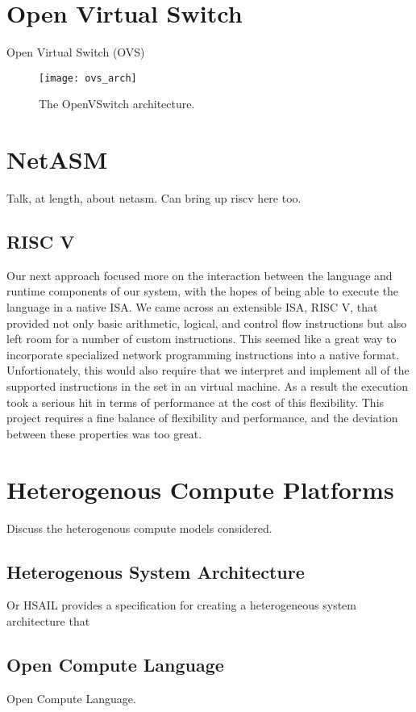 \section{Open Virtual Switch}
\label{related:ovs}
Open Virtual Switch (OVS)
\begin{figure}[h]
\centering
\texttt{[image: ovs\_arch]}
\caption{The OpenVSwitch architecture.}
\label{related:ovs_arch}
\end{figure}

\section{NetASM}
\label{related:netasm}
Talk, at length, about netasm. Can bring up riscv here too.

\subsection{RISC V}
Our next approach focused more on the interaction between the language and
runtime components of our system, with the hopes of being able to execute
the language in a native ISA. We came across an extensible ISA, RISC V, that
provided not only basic arithmetic, logical, and control flow instructions but
also left room for a number of custom instructions. This seemed like a great
way to incorporate specialized network programming instructions into a native
format. Unfortionately, this would also require that we interpret and implement
all of the supported instructions in the set in an virtual machine. As a result
the execution took a serious hit in terms of performance at the cost of this
flexibility. This project requires a fine balance of flexibility and
performance, and the deviation between these properties was too great.

\section{Heterogenous Compute Platforms}
\label{related:hcp}
Discuss the heterogenous compute models considered.

\subsection{Heterogenous System Architecture}
\label{related:hcp:hsa}
Or HSAIL \cite{hsail} provides a specification for creating a heterogeneous
system architecture that

\subsection{Open Compute Language}
\label{related:hcp:ocl}
Open Compute Language.

